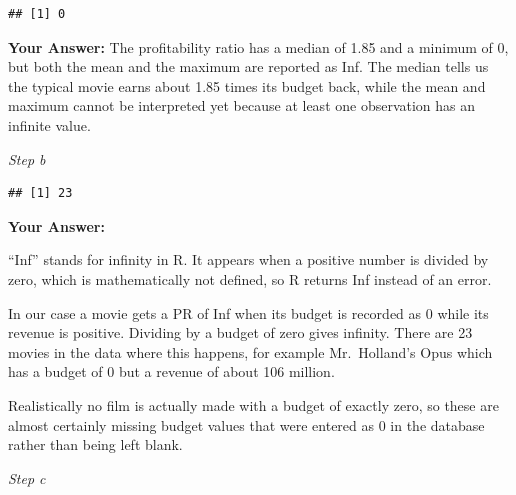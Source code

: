 \documentclass[
]{article}
\newenvironment{Shaded}{\begin{snugshade}}{\end{snugshade}}
\newcommand{\CommentTok}[1]{\textcolor[rgb]{0.56,0.35,0.01}{\textit{#1}}}
\newcommand{\DecValTok}[1]{\textcolor[rgb]{0.00,0.00,0.81}{#1}}
\newcommand{\FunctionTok}[1]{\textcolor[rgb]{0.13,0.29,0.53}{\textbf{#1}}}
\newcommand{\NormalTok}[1]{#1}
\newcommand{\SpecialCharTok}[1]{\textcolor[rgb]{0.81,0.36,0.00}{\textbf{#1}}}
\begin{document}
\begin{verbatim}
## [1] 0
\end{verbatim}

\textbf{Your Answer:} The profitability ratio has a median of 1.85 and a
minimum of 0, but both the mean and the maximum are reported as Inf. The
median tells us the typical movie earns about 1.85 times its budget
back, while the mean and maximum cannot be interpreted yet because at
least one observation has an infinite value.

\emph{Step b}

\begin{Shaded}
\end{Shaded}

\begin{verbatim}
## [1] 23
\end{verbatim}

\textbf{Your Answer:}

``Inf'' stands for infinity in R. It appears when a positive number is
divided by zero, which is mathematically not defined, so R returns Inf
instead of an error.

In our case a movie gets a PR of Inf when its budget is recorded as 0
while its revenue is positive. Dividing by a budget of zero gives
infinity. There are 23 movies in the data where this happens, for
example Mr.~Holland's Opus which has a budget of 0 but a revenue of
about 106 million.

Realistically no film is actually made with a budget of exactly zero, so
these are almost certainly missing budget values that were entered as 0
in the database rather than being left blank.

\emph{Step c}

\begin{Shaded}
\end{Shaded}
\end{document}
